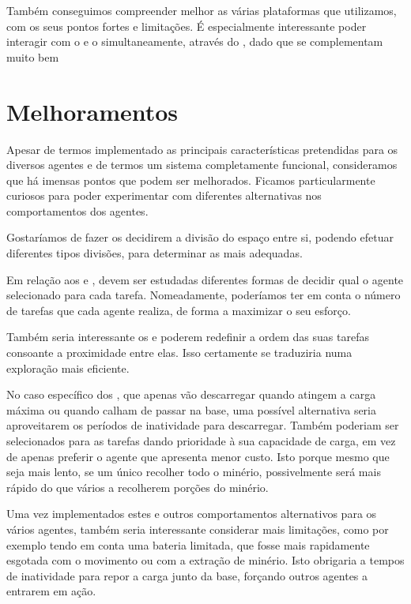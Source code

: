 \documentclass[12pt]{report}
\begin{document}
Também conseguimos compreender melhor as várias plataformas que utilizamos, com os seus pontos fortes e limitações. É especialmente interessante poder interagir com o \jade e o \repast simultaneamente, através do \sajas, dado que se complementam muito bem

\chapter{Melhoramentos}

Apesar de termos implementado as principais características pretendidas para os diversos agentes e de termos um sistema completamente funcional, consideramos que há imensas pontos que podem ser melhorados. Ficamos particularmente curiosos para poder experimentar com diferentes alternativas nos comportamentos dos agentes. 

Gostaríamos de fazer os \spotters decidirem a divisão do espaço entre si, podendo efetuar diferentes tipos divisões, para determinar as mais adequadas. 

Em relação aos \producers e \transporters, devem ser estudadas diferentes formas de decidir qual o agente selecionado para cada tarefa. Nomeadamente, poderíamos ter em conta o número de tarefas que cada agente realiza, de forma a maximizar o seu esforço.

Também seria interessante os \producers e \transporters poderem redefinir a ordem das suas tarefas consoante a proximidade entre elas. Isso certamente se traduziria numa exploração mais eficiente.

No caso específico dos \transporters, que apenas vão descarregar quando atingem a carga máxima ou quando calham de passar na base, uma possível alternativa seria aproveitarem os períodos de inatividade para descarregar. Também poderiam ser selecionados para as tarefas dando prioridade à sua capacidade de carga, em vez de apenas preferir o agente que apresenta menor custo. Isto porque mesmo que seja mais lento, se um único \transporter recolher todo o minério, possivelmente será mais rápido do que vários \transporters a recolherem porções do minério.

Uma vez implementados estes e outros comportamentos alternativos para os vários agentes, também seria interessante considerar mais limitações, como por exemplo tendo em conta uma bateria limitada, que fosse mais rapidamente esgotada com o movimento ou com a extração de minério. Isto obrigaria a tempos de inatividade para repor a carga junto da base, forçando outros agentes a entrarem em ação.
\end{document}
